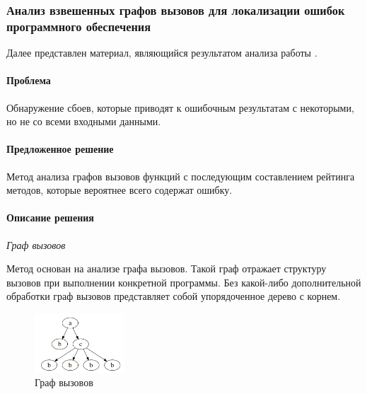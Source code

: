 \def\notedate{2021.11.10}
\def\currentauthor{Крехтунова Д.Д. (РК6-73Б)}

\subsubsection{Анализ взвешенных графов вызовов для локализации ошибок программного обеспечения}

Далее представлен материал, являющийся результатом анализа работы \cite{Eichinger2008}.

\paragraph{Проблема}

Обнаружение сбоев, которые приводят к ошибочным результатам с некоторыми, но не со всеми входными данными.

\paragraph{Предложенное решение}

Метод анализа графов вызовов функций с последующим составлением рейтинга методов, которые вероятнее всего содержат ошибку. 

\paragraph{Описание решения}

\textit{Граф вызовов}

Метод основан на анализе графа вызовов. Такой граф отражает структуру вызовов при выполнении конкретной программы. Без какой-либо дополнительной обработки граф вызовов представляет собой упорядоченное дерево с корнем.

\begin{figure}[!ht]
	\centering
	\includegraphics[width=0.3\textwidth]{ResearchNotes/rndhpc_not_edt_2021_11_10/krekhtunova/graph.png}
	\caption{Граф вызовов} 
\end{figure}

